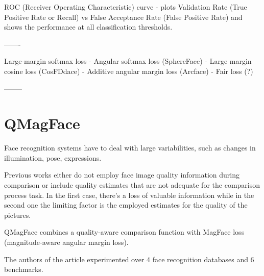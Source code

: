 \documentclass[class=report, crop=false, a4paper, 12pt]{standalone}
\begin{document}
ROC (Receiver Operating Characteristic) curve - plots Validation Rate (True Positive Rate or Recall) vs False Acceptance Rate (False Positive Rate) and shows the performance at all classification thresholds.

-------

Large-margin softmax loss
    - Angular softmax loss (SphereFace)
    - Large margin cosine loss (CosFDdace)
    - Additive angular margin loss (Arcface)
    - Fair loss (?)




--------
\section{QMagFace}
Face recognition systems have to deal with large variabilities, such as changes in illumination, pose, expressions.

Previous works either do not employ face image quality information during comparison or include quality estimates that are not adequate for the comparison process task. In the first case, there's a loss of valuable information while in the second one the limiting factor is the employed estimates for the quality of the pictures.

QMagFace combines a quality-aware comparison function with MagFace loss (magnitude-aware angular margin loss). 

The authors of the article experimented over 4 face recognition databases and 6 benchmarks.
\end{document}

